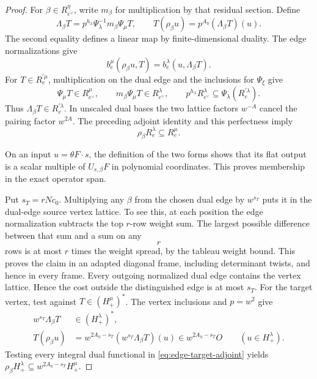 \begin{proof}
For \(\beta\in R_{e^\vee}^{\eta}\), write \(m_\beta\) for
multiplication by that residual section. Define
\[
   \Lambda_\beta T
       =p^{h_\lambda}\Psi_\lambda^{-1}
                      m_\beta\Psi_\mu T,\qquad
   T(\rho_\beta u)=p^{A_\eta}(\Lambda_\beta T)(u).
\]
The second equality defines a linear map by finite-dimensional
duality. The edge normalizations give
\[
 b_e^\mu(\rho_\beta u,T)=b_e^\lambda(u,\Lambda_\beta T).
\]
For \(T\in R_e^{\prime\mu}\), multiplication on the dual edge and
the inclusions for \(\Psi_\xi\) give
\[
 \Psi_\mu T\in R_{e^\vee}^\mu,\qquad
 m_\beta\Psi_\mu T\in R_{e^\vee}^\lambda,\qquad
 p^{h_\lambda}R_{e^\vee}^\lambda\subseteq
                              \Psi_\lambda(R_e^{\prime\lambda}).
\]
Thus \(\Lambda_\beta T\in R_e^{\prime\lambda}\).
In unscaled dual bases the two lattice factors \(w^{-A}\) cancel
the pairing factor \(w^{2A}\). The preceding adjoint identity
and this perfectness imply
\[
 \rho_\beta R_e^\lambda\subseteq R_e^\mu.
\]

On an input
\(u=\theta F\cdot s\), the definition of the two forms shows
that its flat output is a scalar multiple of
\(U_{s,\beta}F\) in polynomial coordinates. This proves
membership in the exact operator span.

Put \(s_T=rNc_0\). Multiplying any \(\beta\) from the chosen
dual edge by \(w^{s_T}\) puts it in the dual-edge source vertex
lattice. To see this, at each position the edge normalization
subtracts the top \(r\)-row weight sum. The largest possible
difference between that sum and a sum on any
\[
 r
\]
rows is at
most \(r\) times the weight spread, by the tableau weight bound.
This proves the claim in an adapted diagonal frame, including
determinant twists, and hence in every frame. Every outgoing normalized dual edge contains the vertex lattice.
Hence the cost outside the distinguished edge is at most \(s_T\).
For the target vertex, test against \(T\in(H_+^\mu)^*\). The vertex
inclusions and \(p=w^2\) give
\begin{equation}\label{eq:edge-target-adjoint}
 \begin{aligned}
 w^{s_T}\Lambda_\beta T &\in(H_+^\lambda)^*,\\
 T(\rho_\beta u)&=w^{2A_\eta-s_T}
          (w^{s_T}\Lambda_\beta T)(u)\in w^{2A_\eta-s_T}O
                      \qquad(u\in H_+^\lambda).
 \end{aligned}
\end{equation}
Testing every integral dual functional in \eqref{eq:edge-target-adjoint} yields
\(\rho_\beta H_+^\lambda\subseteq w^{2A_\eta-s_T}H_+^\mu\).


\end{proof}

